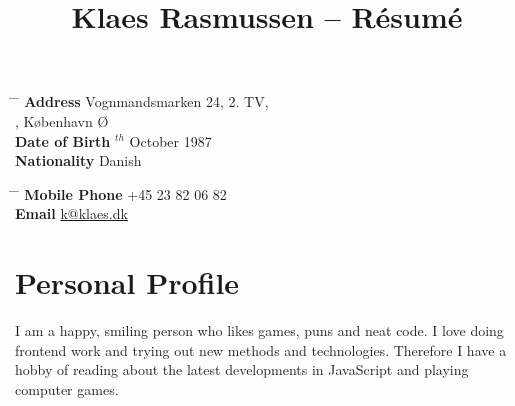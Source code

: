 \documentclass[10pt]{article} %
\begin{document}

\title{Klaes Rasmussen -- Résumé} %


\parbox{0.5\textwidth}{ %
\begin{tabbing} %
\hspace{3cm} \= \hspace{4cm} \= \kill %
{\bf Address} \> Vognmandsmarken 24, 2. TV,\\ %
, København Ø \\ %
{\bf Date of Birth} $^{th}$ October 1987 \\ %
{\bf Nationality} \> Danish %
\end{tabbing}}
\hfill %
\parbox{0.5\textwidth}{ %
\begin{tabbing} %
\hspace{3cm} \= \hspace{4cm} \= \kill %
{\bf Mobile Phone} \> +45 23 82 06 82 \\ %
{\bf Email} \> \href{mailto:k@klaes.dk}{k@klaes.dk} \\ %
\end{tabbing}}


\section{Personal Profile}

I am a happy, smiling person who likes games, puns and neat code. I love doing frontend work
and trying out new methods and technologies. 
Therefore I have a hobby of reading about the latest developments in JavaScript
and playing computer games.

\end{document}
